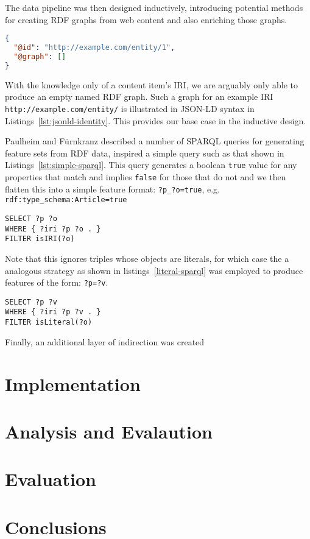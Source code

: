 \documentclass{sig-alternate-05-2015}
\begin{document}
The data pipeline was then designed inductively, introducing potential
methods for creating RDF graphs from web content and also enriching those
graphs.

\begin{centering}
\begin{lstlisting}[label=lst:jsonld-identity,caption={Identity graph for a content item in JSON-LD syntax},language=json]
{
  "@id": "http://example.com/entity/1",
  "@graph": []
}
\end{lstlisting}
\end{centering}

With the knowledge only of a content item's IRI, we are arguably only able to
produce an empty named RDF graph. Such a graph for an example IRI
\texttt{http://example.com/entity/} is illustrated in
JSON-LD syntax in Listings~\ref{lst:jsonld-identity}. This provides our
base case in the inductive design.

Paulheim and F\"urnkranz\cite{paulheim2012unsupervised} described a number of
SPARQL queries for generating feature sets from RDF data, inspired
a simple query such as that shown in Listings~\ref{lst:simple-sparql}. This
query generates a boolean \texttt{true} value for any properties that match
and implies \texttt{false} for those that do not and we then flatten this into
a simple feature format: \texttt{?p\_?o=true},
e.g. \texttt{rdf:type\_schema:Article=true}

\begin{lstlisting}[label=lst:simple-sparql,caption={Generates field \texttt{content\_?p\_?v} with value \texttt{true}},language=sparql]
SELECT ?p ?o
WHERE { ?iri ?p ?o . }
FILTER isIRI(?o)
\end{lstlisting}

Note that this ignores triples whose objects are literals, for which case the
a analogous strategy as shown in listings~\ref{literal-sparql} was employed to
produce features of the form: \texttt{?p=?v}.

\begin{lstlisting}[label=lst:literal-sparql,caption={Generates field \texttt{content\_?p\_?v} with value \texttt{true}},language=sparql]
SELECT ?p ?v
WHERE { ?iri ?p ?v . }
FILTER isLiteral(?o)
\end{lstlisting}

Finally, an additional layer of indirection was created

\section{Implementation}

\section{Analysis and Evalaution}

\section{Evaluation}

\section{Conclusions}

%
%
\end{document}
